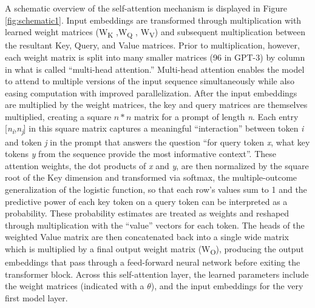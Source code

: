 \documentclass{article} %
\begin{document}
A schematic overview of the self-attention mechanism is displayed in
Figure \ref{fig:schematic1}. Input embeddings are transformed through multiplication with
learned weight matrices (W\textsubscript{K} ,W\textsubscript{Q} ,
W\textsubscript{V}) and subsequent multiplication between the resultant
Key, Query, and Value matrices. Prior to multiplication, however, each
weight matrix is split into many smaller matrices (96 in GPT-3) by
column in what is called ``multi-head attention.'' Multi-head attention
enables the model to attend to multiple versions of the input sequence
simultaneously while also easing computation with improved
parallelization. After the input embeddings are multiplied by the weight
matrices, the key and query matrices are themselves multiplied, creating
a square $n * n$ matrix for a prompt of length \emph{n}. Each entry
{[}\emph{n\textsubscript{i}},\emph{n\textsubscript{j}}{]} in this square
matrix captures a meaningful ``interaction'' between token \emph{i} and
token \emph{j} in the prompt that answers the question ``for query token
\emph{x}, what key tokens \emph{y} from the sequence provide the most
informative context''. These attention weights, the dot products of
\emph{x} and \emph{y}, are then normalized by the square root of the Key
dimension and transformed via softmax, the multiple-outcome
generalization of the logistic function, so that each row's
values sum to 1 and the predictive power of each key token on a query
token can be interpreted as a probability. These probability estimates
are treated as weights and reshaped through multiplication with the
``value'' vectors for each token. The heads of the weighted Value matrix
are then concatenated back into a single wide matrix which is multiplied
by a final output weight matrix (W\textsubscript{O}), producing the
output embeddings that pass through a feed-forward neural network before
exiting the transformer block. Across this self-attention layer, the
learned parameters include the weight matrices (indicated with a $\theta$),
and the input embeddings for the very first model layer.
\end{document}
